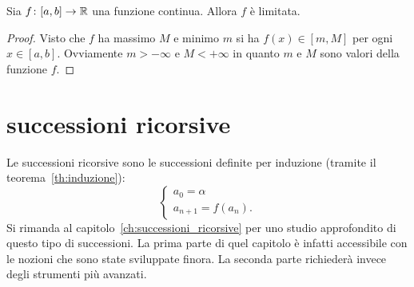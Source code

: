 \begin{corollary}
Sia $f\colon [a,b]\to \mathbb R$ una funzione continua. Allora $f$ è limitata.
\end{corollary}
\begin{proof}
Visto che $f$ ha massimo $M$ e minimo $m$ si ha $f(x)\in [m,M]$ per ogni $x\in[a,b]$.
Ovviamente $m>-\infty$ e $M<+\infty$ in quanto $m$ e $M$ sono valori della funzione $f$.
\end{proof}


\section{successioni ricorsive}

Le successioni ricorsive sono le successioni
definite per induzione (tramite il teorema~\ref{th:induzione}):
\[
 \begin{cases}
   a_0 = \alpha \\
   a_{n+1} = f(a_n).
 \end{cases}
\]
Si rimanda al capitolo~\ref{ch:successioni_ricorsive}
per uno studio approfondito di questo tipo di successioni.
La prima parte di quel capitolo è infatti accessibile con le nozioni
che sono state sviluppate finora.
La seconda parte richiederà invece degli strumenti più avanzati.

